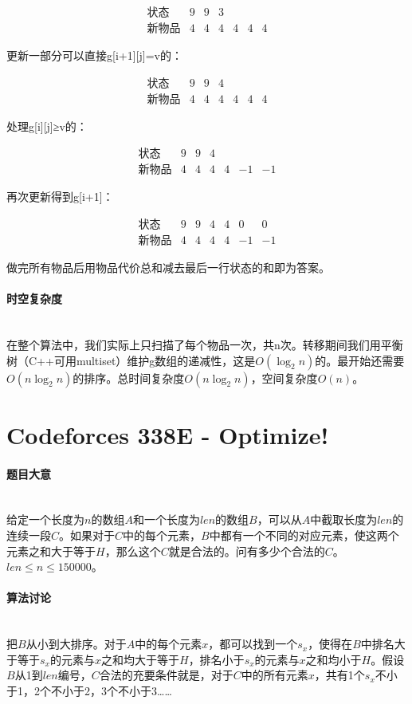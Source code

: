 \documentclass[UTF8]{ctexart}
\newcommand{\myparagraph}[1]{\paragraph{#1}\mbox{}\\}
\theoremstyle{nonumberplain}
\begin{document}
			$$\begin{array}{lcccccc}
				\mbox{状态} & 9 & 9 & 3 &  &  &  \\
				\mbox{新物品} & 4 & 4 & 4 & 4 & 4 & 4
			\end{array}$$
			
			更新一部分可以直接g[i+1][j]=v的：
			
			$$\begin{array}{lcccccc}
				\mbox{状态} & 9 & 9 & 4 &  &  &  \\
				\mbox{新物品} & 4 & 4 & 4 & 4 & 4 & 4
			\end{array}$$
			
			处理g[i][j]≥v的：
			
			$$\begin{array}{lcccccc}
				\mbox{状态} & 9 & 9 & 4 &  &  &  \\
				\mbox{新物品} & 4 & 4 & 4 & 4 & -1 & -1
			\end{array}$$
			
			再次更新得到g[i+1]：
			
			$$\begin{array}{lcccccc}
				\mbox{状态} & 9 & 9 & 4 & 4 & 0 & 0 \\
				\mbox{新物品} & 4 & 4 & 4 & 4 & -1 & -1
			\end{array}$$
			
			做完所有物品后用物品代价总和减去最后一行状态的和即为答案。
		
		\myparagraph{时空复杂度}
		
			在整个算法中，我们实际上只扫描了每个物品一次，共n次。转移期间我们用平衡树（C++可用multiset）维护g数组的递减性，这是$O(\log_2n)$的。最开始还需要$O(n\log_2n)$的排序。总时间复杂度$O(n\log_2n)$，空间复杂度$O(n)$。
	
	\section{Codeforces 338E - Optimize!}
	
		\myparagraph{题目大意}
		
			给定一个长度为$n$的数组$A$和一个长度为$len$的数组$B$，可以从$A$中截取长度为$len$的连续一段$C$。如果对于$C$中的每个元素，$B$中都有一个不同的对应元素，使这两个元素之和大于等于$H$，那么这个$C$就是合法的。问有多少个合法的$C$。$len \leq n \leq 150000$。
		
		\myparagraph{算法讨论}
		
			把$B$从小到大排序。对于$A$中的每个元素$x$，都可以找到一个$s_x$，使得在$B$中排名大于等于$s_x$的元素与$x$之和均大于等于$H$，排名小于$s_x$的元素与$x$之和均小于$H$。假设$B$从1到$len$编号，$C$合法的充要条件就是，对于$C$中的所有元素$x$，共有1个$s_x$不小于1，2个不小于2，3个不小于3……
			
\end{document}
